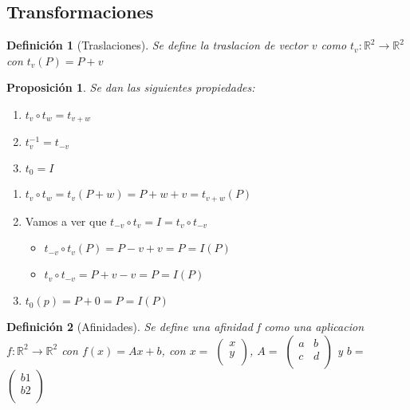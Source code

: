 \documentclass[11pt, a4paper, titlepage]{article}
\makeatletter
\renewenvironment{proof}[1][\proofname] {\vspace{-15pt}\par\pushQED{\qed}\normalfont\topsep6\p@\@plus6\p@\relax\trivlist\item[\hskip\labelsep\it#1\@addpunct{.}]\ignorespaces}{\popQED\endtrivlist\@endpefalse}
\newcommand{\R}{\mathbb{R}}
\theoremstyle{theorem-style}
\newtheorem*{nprop}{Proposición}
\theoremstyle{definition-style}
\newtheorem*{ndef}{Definición}
\theoremstyle{remark-style}
\theoremstyle{example-style}
\newenvironment{nlist}
{\begin{enumerate}
    \renewcommand\labelenumi{(\emph{\roman{enumi})}}}
  {\end{enumerate}}
\makeatother
\begin{document}
\subsection{Transformaciones}

\begin{ndef}[Traslaciones]
  Se define la traslacion de vector $v$ como $t_v: \R^2 \rightarrow \R^2$ con $t_v(P) = P + v$
\end{ndef}

\begin{nprop}
  Se dan las siguientes propiedades:
  \begin{nlist}
  \item $t_v \circ t_w = t_{v+w}$
  \item $t_{v}^{-1} = t_{-v}$
  \item $t_0 = I$
  \end{nlist}
\end{nprop}
\begin{proof}\hfill \begin{center}\end{center}
  \begin{nlist}
  \item $t_v \circ t_w = t_v(P+w) = P+w+v = t_{v+w}(P)$
  \item Vamos a ver que $t_{-v}\circ t_v = I = t_v \circ t_{-v}$
    \begin{itemize}
    \item $t_{-v}\circ t_v (P) = P-v+v = P = I(P)$
    \item $t_v\circ t_{-v} = P+v-v = P = I(P)$
    \end{itemize}
  \item $t_0(p) = P +0 = P = I(P)$
  \end{nlist}
\end{proof}

\begin{ndef}[Afinidades]
  Se define una afinidad f como una aplicacion $f:\R^2 \rightarrow \R^2$ con $f(x) = Ax + b$, con $x =$ $\begin{pmatrix}
    x\\
    y\\
  \end{pmatrix}$, $A =$ $\begin{pmatrix}
    a & b\\
    c & d\\
  \end{pmatrix}$
  y $b =$ $\begin{pmatrix}
    b1\\
    b2\\
  \end{pmatrix}$


\end{ndef}
\end{document}
